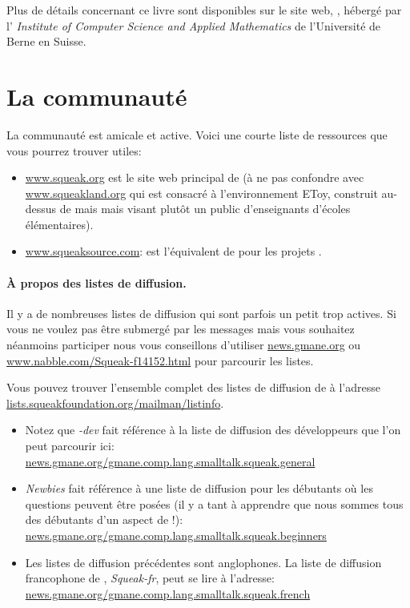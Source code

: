 \documentclass[a4paper,10pt,twoside]{book}
\begin{document}
Plus de d\'etails concernant ce livre sont disponibles sur le site
web, \spe, h\'eberg\'e par l' \emph{Institute of Computer Science and
  Applied Mathematics} de l'Universit\'e de Berne en Suisse.

\section*{La communaut\'e \sq}

La communaut\'e \sq est amicale et active.
Voici une courte liste de ressources que vous pourrez trouver utiles:

\begin{itemize}
\item \url{www.squeak.org} est le site web principal de \sq (\`a ne
  pas confondre avec  \url{www.squeakland.org} qui est consacr\'e \`a
  l'environnement EToy, construit au-dessus de \sq mais mais visant
  plutôt un public d'enseignants d'écoles élémentaires).

\item \url{www.squeaksource.com}: \squeaksource est l'\'equivalent de \sourceforge pour les projets \sq.
\end{itemize}

\paragraph{\`A propos des listes de diffusion.} Il y a de nombreuses listes de diffusion qui sont parfois un petit trop actives. Si vous ne voulez pas \^etre submerg\'e par les messages mais vous souhaitez n\'eanmoins participer nous vous conseillons d'utiliser \url{news.gmane.org} ou \url{www.nabble.com/Squeak-f14152.html} pour parcourir les listes.

Vous pouvez trouver l'ensemble complet des listes de diffusion de \sq \`a l'adresse \url{lists.squeakfoundation.org/mailman/listinfo}.

\begin{itemize}
\item Notez que \emph{\sq-dev} fait r\'ef\'erence \`a la liste de diffusion des d\'eveloppeurs  que l'on peut parcourir ici:\\
\url{news.gmane.org/gmane.comp.lang.smalltalk.squeak.general}
\item \emph{Newbies} fait r\'ef\'erence \`a une liste de diffusion
  pour les d\'ebutants o\`u les questions peuvent \^etre pos\'ees (il
  y a tant \`a apprendre que nous sommes tous des d\'ebutants d'un
  aspect de \sq!):\\
\url{news.gmane.org/gmane.comp.lang.smalltalk.squeak.beginners}
\item Les listes de diffusion pr\'ec\'edentes sont anglophones. La
  liste de diffusion francophone de \sq, \emph{Squeak-fr}, peut se
  lire \`a l'adresse:\\
\url{news.gmane.org/gmane.comp.lang.smalltalk.squeak.french}
\end{itemize}
\end{document}
